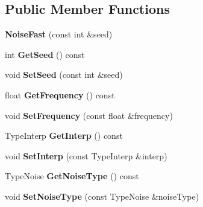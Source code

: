 \subsection*{Public Member Functions}
\begin{DoxyCompactItemize}
\item 
\mbox{\label{class_flounder_1_1_noise_fast_a8e4b1dec1563ab06f391defca51b3260}} 
{\bfseries Noise\+Fast} (const int \&seed)
\item 
\mbox{\label{class_flounder_1_1_noise_fast_afba4ad564e2b5a689d025de5b3c08188}} 
int {\bfseries Get\+Seed} () const
\item 
\mbox{\label{class_flounder_1_1_noise_fast_a62465cbc092270b8cac650cf76a01ca5}} 
void {\bfseries Set\+Seed} (const int \&seed)
\item 
\mbox{\label{class_flounder_1_1_noise_fast_ac3f251524b58e8940d2c98368776800c}} 
float {\bfseries Get\+Frequency} () const
\item 
\mbox{\label{class_flounder_1_1_noise_fast_aa29887e5e431406aa4870c286087f3e3}} 
void {\bfseries Set\+Frequency} (const float \&frequency)
\item 
\mbox{\label{class_flounder_1_1_noise_fast_a98424167702be655c1e8893d90f523c7}} 
Type\+Interp {\bfseries Get\+Interp} () const
\item 
\mbox{\label{class_flounder_1_1_noise_fast_a9a5497f5188e26dbfddf8a97406322b1}} 
void {\bfseries Set\+Interp} (const Type\+Interp \&interp)
\item 
\mbox{\label{class_flounder_1_1_noise_fast_a9169ab026800165e0a94670dceed27ba}} 
Type\+Noise {\bfseries Get\+Noise\+Type} () const
\item 
\mbox{\label{class_flounder_1_1_noise_fast_aab31972b041bf6a619f5d36dbf8bbb71}} 
void {\bfseries Set\+Noise\+Type} (const Type\+Noise \&noise\+Type)
\item 
\mbox{\label{class_flounder_1_1_noise_fast_a4acfd88a6ecb7e1c5f8f9c7cc6e01ae0}} 

\end{DoxyCompactItemize}
